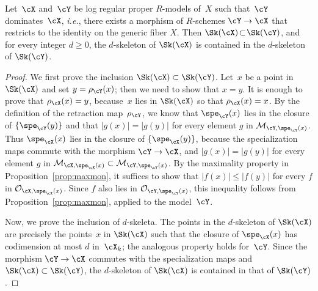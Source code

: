 \begin{prop}\label{prop:compat1}
Let~$\cX$ and~$\cY$ be log regular proper $R$\nobreakdash-models of~$X$ such that~$\cY$ dominates~$\cX$, {\em i.e.}, there exists a morphism of $R$\nobreakdash-schemes $\cY\to \cX$ that restricts to the identity on the generic fiber $X$. Then $\Sk(\cX)\!\subset\!\Sk(\cY)$, and for every integer $d\!\geq\!0$, the $d$\nobreakdash-skeleton of $\Sk(\cX)$ is contained in the $d$\nobreakdash-skeleton of $\Sk(\cY)$.
\end{prop}
\begin{proof}
We first prove the inclusion $\Sk(\cX)\subset \Sk(\cY)$.
Let~$x$ be a point in $\Sk(\cX)$ and
set $y=\rho_{\cY}(x)$; then we need to show that $x=y$. It is enough to prove that $\rho_{\cX}(x)=y$, because~$x$ lies in $\Sk(\cX)$ so that $\rho_{\cX}(x)=x$.
By the definition of the retraction map~$\rho_{\cY}$, we know that $\spe_{\cY}(x)$ lies in the closure of $\{\spe_{\cY}(y)\}$
and that $|g(x)|=|g(y)|$ for every element $g$ in $\mathcal{M}_{\cY,\spe_{\cY}(x)}$.
Thus $\spe_{\cX}(x)$ lies in the closure of $\{\spe_{\cX}(y)\}$, because the specialization maps commute with the morphism \hbox{$\cY\to \cX$}, and
$|g(x)|=|g(y)|$ for every element $g$ in $\mathcal{M}_{\cX,\spe_{\cX}(x)}\subset \mathcal{M}_{\cY,\spe_{\cY}(x)}$.
By the maximality property in Proposition~\ref{prop:maxmon}, it suffices to show that $|f(x)|\leq |f(y)|$ for every $f$ in $\mathcal{O}_{\cX,\spe_{\cX}(x)}$.
Since $f$ also lies in $\mathcal{O}_{\cY,\spe_{\cY}(x)}$, this inequality follows from Proposition~\ref{prop:maxmon}, applied to the model~$\cY$.

Now, we prove the inclusion of $d$\nobreakdash-skeleta.
The points in the $d$\nobreakdash-skeleton of $\Sk(\cX)$ are precisely the points~$x$ in $\Sk(\cX)$ such that the closure of $\spe_{\cX}(x)$ has codimension at most $d$ in~$\cX_k$; the analogous property holds for~$\cY$.
Since the morphism $\cY\to \cX$ commutes with the specialization maps and $\Sk(\cX)\subset \Sk(\cY)$, the $d$\nobreakdash-skeleton of $\Sk(\cX)$ is contained in that of $\Sk(\cY)$.
\end{proof}

